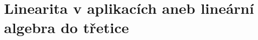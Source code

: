 \setchaptertoc
\chapter{Linearita v aplikacích aneb lineární algebra do třetice}\label{mai:IIchapIII}


